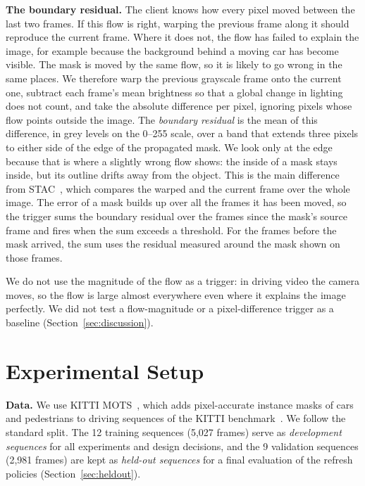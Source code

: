 \documentclass[conference]{IEEEtran}
\begin{document}
\textbf{The boundary residual.} The client knows how every pixel moved between the last two frames. If this flow is right, warping the previous frame along it should reproduce the current frame. Where it does not, the flow has failed to explain the image, for example because the background behind a moving car has become visible. The mask is moved by the same flow, so it is likely to go wrong in the same places. We therefore warp the previous grayscale frame onto the current one, subtract each frame's mean brightness so that a global change in lighting does not count, and take the absolute difference per pixel, ignoring pixels whose flow points outside the image.
The \emph{boundary residual} is the mean of this difference, in grey levels on the 0--255 scale, over a band that extends three pixels to either side of the edge of the propagated mask. We look only at the edge because that is where a slightly wrong flow shows: the inside of a mask stays inside, but its outline drifts away from the object. This is the main difference from STAC~\cite{xiao2022stac}, which compares the warped and the current frame over the whole image. The error of a mask builds up over all the frames it has been moved, so the trigger sums the boundary residual over the frames since the mask's source frame and fires when the sum exceeds a threshold. For the frames before the mask arrived, the sum uses the residual measured around the mask shown on those frames.

We do not use the magnitude of the flow as a trigger: in driving video the camera moves, so the flow is large almost everywhere even where it explains the image perfectly. We did not test a flow-magnitude or a pixel-difference trigger as a baseline (Section~\ref{sec:discussion}).

\section{Experimental Setup}

\textbf{Data.} We use KITTI MOTS~\cite{voigtlaender2019mots}, which adds pixel-accurate instance masks of cars and pedestrians to driving sequences of the KITTI benchmark~\cite{geiger2012kitti}. We follow the standard split. The 12 training sequences (5{,}027 frames) serve as \emph{development sequences} for all experiments and design decisions, and the 9 validation sequences (2{,}981 frames) are kept as \emph{held-out sequences} for a final evaluation of the refresh policies (Section~\ref{sec:heldout}).
\end{document}
